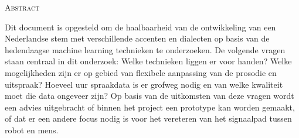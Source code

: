 \begin{center}
  \textsc{Abstract}
\end{center}
%
\noindent
%
Dit document is opgesteld om de haalbaarheid van de ontwikkeling van een Nederlandse stem met verschillende accenten en dialecten op basis van de hedendaagse machine learning technieken te onderzoeken. De volgende vragen staan centraal in dit onderzoek: Welke technieken liggen er voor handen? Welke mogelijkheden zijn er op gebied van flexibele aanpassing van de prosodie en uitspraak? Hoeveel uur spraakdata is er grofweg nodig en van welke kwaliteit moet die data ongeveer zijn? Op basis van de uitkomsten van deze vragen wordt een advies uitgebracht of binnen het project een prototype kan worden gemaakt, of dat er een andere focus nodig is voor het vereteren van het signaalpad tussen robot en mens.
